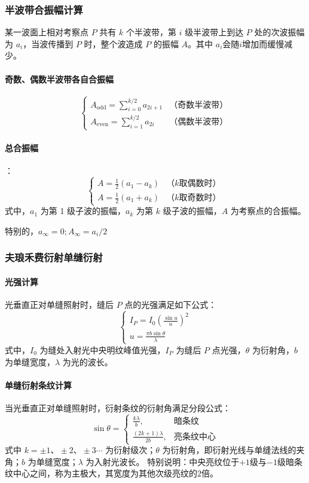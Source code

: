 \documentclass{article}
\begin{document}
	\subsubsection{半波带合振幅计算}
	某一波面上相对考察点 \(P\) 共有 \(k\) 个半波带，第 \(i\) 级半波带上到达 \(P\) 处的次波振幅为 \(a_i\)，当波传播到 \(P\) 时，整个波造成 \(P\) 的振幅 \(A\)。其中 \(a_i\)会随$ i $增加而缓慢减少。
	
	\paragraph{奇数、偶数半波带各自合振幅}
	\[
	\begin{cases}
		A_{\text{odd}} = \sum_{i = 0}^{k/2}a_{2i + 1} & \text{（奇数半波带）} \\
		A_{\text{even}} = \sum_{i = 1}^{k/2}a_{2i} & \text{（偶数半波带）}
	\end{cases}
	\]
	
	\paragraph{总合振幅}：
	\[
	\begin{cases}
		A = \frac{1}{2}(a_1 - a_k) & \text{（}k\text{取偶数时）} \\
		A = \frac{1}{2}(a_1 + a_k) & \text{（}k\text{取奇数时）}
	\end{cases}
	\]
	式中，\(a_1\) 为第 1 级子波的振幅，\(a_k\) 为第 \(k\) 级子波的振幅，\(A\) 为考察点的合振幅。
	
	特别的，$a_\infty = 0 ; A_\infty = a_i/2$
	\subsubsection{夫琅禾费衍射单缝衍射}
	
	\paragraph{光强计算}
	光垂直正对单缝照射时，缝后 \(P\) 点的光强满足如下公式：
	\[
	\begin{cases}
		I_P = I_0 \left( \frac{\sin u}{u} \right)^2 \\
		u = \frac{\pi b \sin\theta}{\lambda}
	\end{cases}
	\]
	式中，\(I_0\) 为缝处入射光中央明纹峰值光强，\(I_P\) 为缝后 \(P\) 点光强，\(\theta\) 为衍射角，\(b\) 为单缝宽度，\(\lambda\) 为光的波长。
	
	\paragraph{单缝衍射条纹计算}
	当光垂直正对单缝照射时，衍射条纹的衍射角满足分段公式：
	\[
	\sin\theta=\begin{cases}\displaystyle\frac{k\lambda}{b},& \text{暗条纹}\\[2ex]\displaystyle\frac{(2k+1)\lambda}{2b},& \text{亮条纹中心}\end{cases}
	\]
	式中 $k=\pm1、\pm2、\pm3\cdots$ 为衍射级次；$\theta$ 为衍射角，即衍射光线与单缝法线的夹角；$b$ 为单缝宽度；$\lambda$ 为入射光波长。
	特别说明：中央亮纹位于$+1$级与$-1$级暗条纹中心之间，称为主极大，其宽度为其他次级亮纹的$2$倍。
	
\end{document}
